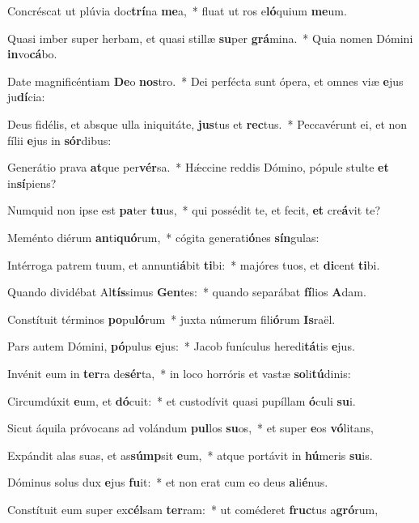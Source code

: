 \item Concréscat ut plúvia doc\textbf{trí}na \textbf{me}a,~* fluat ut ros e\textbf{ló}quium \textbf{me}um.
\item Quasi imber super herbam, et quasi stillæ \textbf{su}per \textbf{grá}mina.~* Quia nomen Dómini \textbf{in}vo\textbf{cá}bo.
\item Date magnificéntiam \textbf{De}o \textbf{nos}tro.~* Dei perfécta sunt ópera, et omnes viæ \textbf{e}jus ju\textbf{dí}cia:
\item Deus fidélis, et absque ulla iniquitáte, \textbf{jus}tus et \textbf{rec}tus.~* Peccavérunt ei, et non fílii \textbf{e}jus in \textbf{sór}dibus:
\item Generátio prava \textbf{at}que per\textbf{vér}sa.~* Hǽccine reddis Dómino, pópule stulte \textbf{et} in\textbf{sí}piens?
\item Numquid non ipse est \textbf{pa}ter \textbf{tu}us,~* qui possédit te, et fecit, \textbf{et} cre\textbf{á}vit te?
\item Meménto diérum \textbf{an}ti\textbf{quó}rum,~* cógita generati\textbf{ó}nes \textbf{sín}gulas:
\item Intérroga patrem tuum, et annunti\textbf{á}bit \textbf{ti}bi:~* majóres tuos, et \textbf{di}cent \textbf{ti}bi.
\item Quando dividébat Al\textbf{tís}simus \textbf{Gen}tes:~* quando separábat \textbf{fí}lios \textbf{A}dam.
\item Constítuit términos \textbf{po}pu\textbf{ló}rum~* juxta númerum fili\textbf{ó}rum \textbf{Is}raël.
\item Pars autem Dómini, \textbf{pó}pulus \textbf{e}jus:~* Jacob funículus heredi\textbf{tá}tis \textbf{e}jus.
\item Invénit eum in \textbf{ter}ra de\textbf{sér}ta,~* in loco horróris et vastæ \textbf{so}li\textbf{tú}dinis:
\item Circumdúxit \textbf{e}um, et \textbf{dó}cuit:~* et custodívit quasi pupíllam \textbf{ó}culi \textbf{su}i.
\item Sicut áquila próvocans ad volándum \textbf{pul}los \textbf{su}os,~* et super \textbf{e}os \textbf{vó}litans,
\item Expándit alas suas, et as\textbf{súmp}sit \textbf{e}um,~* atque portávit in \textbf{hú}meris \textbf{su}is.
\item Dóminus solus dux \textbf{e}jus \textbf{fu}it:~* et non erat cum eo deus \textbf{a}li\textbf{é}nus.
\item Constítuit eum super ex\textbf{cél}sam \textbf{ter}ram:~* ut coméderet \textbf{fruc}tus a\textbf{gró}rum,
